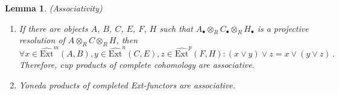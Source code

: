 \documentclass[12pt, a4paper]{article}
\numberwithin{equation}{section}
\newtheorem{lem}[thm]{Lemma}
\theoremstyle{empty}
\theoremstyle{nonumberplain}
\begin{document}
\begin{lem}\label{lem:cohomprodsassoc}
(Associativity)
\begin{enumerate}
    \item If there are objects $A$, $B$, $C$, $E$, $F$, $H$ such that $A_{\bullet} \otimes_R C_{\bullet} \otimes_R H_{\bullet}$ is a projective resolution of $A \otimes_R C \otimes_R H$, then
    \[ \forall x \in \widehat{\mathrm{Ext}}^m(A, B), y \in \widehat{\mathrm{Ext}}^n(C, E), z \in \widehat{\mathrm{Ext}}^p(F, H): (x \vee y) \vee z = x \vee (y \vee z) \, . \]
    Therefore, cup products of complete cohomology are associative.
    \item Yoneda products of completed Ext-functors are associative.
\end{enumerate}
\end{lem}
\end{document}
